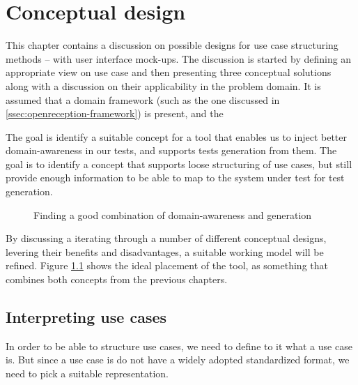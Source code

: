\chapter{Conceptual design}
\label{chap:conceptual_design}
This chapter contains a discussion on possible designs for use case structuring methods -- with user interface mock-ups. The discussion is started by defining an appropriate view on use case and then presenting three conceptual solutions along with a discussion on their applicability in the problem domain. It is assumed that a domain framework (such as the one discussed in \ref{ssec:openreception-framework}) is present, and the \medskip

\noindent The goal is identify a suitable concept for a tool that enables us to inject better domain-awareness in our tests, and supports tests generation from them. The goal is to identify a concept that supports loose structuring of use cases, but still provide enough information to be able to map to the system under test for test generation.\medskip
\begin{figure}[!htbp]
\centering

\caption{Finding a good combination of domain-awareness and generation}
\label{fig:project_parameter_plot_project}
\end{figure}

\noindent By discussing a iterating through a number of different conceptual designs, levering their benefits and disadvantages, a suitable  working model will be refined. Figure \ref{fig:project_parameter_plot_project} shows the ideal placement of the tool, as something that combines both concepts from the previous chapters.

\section{Interpreting use cases}
In order to be able to structure use cases, we need to define to it what a use case is. But since a use case is do not have a widely adopted standardized format, we need to pick a suitable representation.\medskip


